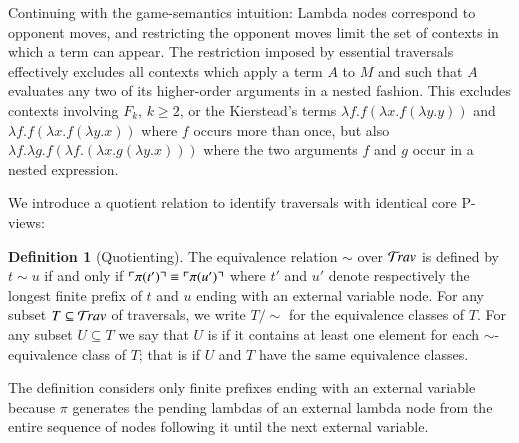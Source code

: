 \documentclass{elsarticle}
\makeatletter
\newif\iflongversion
\theoremstyle{plain}
\newtheorem{property}[theorem]{Property}
\theoremstyle{definition}
\newtheorem{definition}{Definition}[section]
\newcommand\Nodes{\mathcal{N}}%
\newcommand\NodesLmd{\Nodes_\lambda}%
\newcommand{\travulc}{\travset}
\def\coresymbol{\pi} %
\newcommand{\core}[1]{\coresymbol(#1)} %
\newcommand{\ExternalNodes}{\Nodes^{\sf ext}}
\renewcommand\ie{{\it i.e.\@\xspace}}
\makeatother
\begin{document}
Continuing with the game-semantics intuition: Lambda nodes correspond to opponent moves, and restricting the opponent moves limit the set of contexts in which a term can appear. The restriction imposed by essential traversals effectively excludes all contexts which apply a term $A$ to $M$ and such that $A$ evaluates any two of its higher-order arguments in a nested fashion. This excludes contexts involving $F_k$, $k\geq 2$, or the Kierstead's terms $\lambda f .f (\lambda x .f (\lambda y.y))$ and $\lambda f .f (\lambda x .f (\lambda y.x))$ where $f$ occurs more than once, but also $\lambda f. \lambda g . f (\lambda f .(\lambda x . g (\lambda y . x)))$ where the two arguments $f$ and $g$ occur in a nested expression.

\iflongversion
\begin{property}
\label{prop:core_truncation_at_externallambda}
Let $t\in\travulc$ be a traversal which does not contain any ghost occurrence, and $m$ be an occurrence in $t$ of an external $\lambda$-node (\ie, $m \in \NodesLmd\inter\ExternalNodes$). Then $\core{t_{<m}} = \core{t}_{<m}$.
\end{property}
\begin{proof}
By an easy induction on $t$ using the fact that in the recursive calculation of $\coresymbol(t)$, external lambda nodes reset the stack of pending lambdas.
\end{proof}
\fi

We introduce a quotient relation to identify traversals with identical core P-views:
\begin{definition}[Quotienting]
The equivalence relation $\sim$ over $\travulc$ is defined by $t \sim u$ if and only if
$\pview{\core{t'}} \equiv \pview{\core{u'}}$
where $t'$ and $u'$ denote respectively the longest finite prefix of $t$ and $u$ ending with an external variable node.
For any subset $T\subseteq \travulc$ of traversals, we write $T/{\sim}$ for the equivalence classes of $T$.
%
For any subset $U\subseteq T$ we say that $U$ is  if it contains at least one element for each $\sim$-equivalence class of $T$; that is if $U$ and $T$ have the same equivalence classes.
\end{definition}
The definition considers only finite prefixes ending with an external variable because $\coresymbol$ generates the pending lambdas of an external lambda node from the entire sequence of nodes following it until the next external variable.
\end{document}

